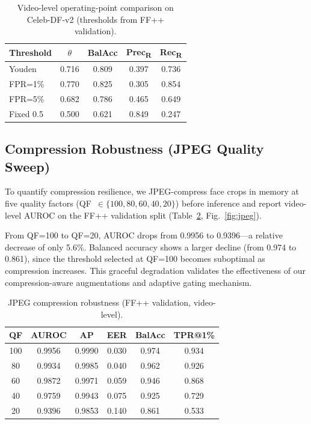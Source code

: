 \documentclass[conference]{IEEEtran}
\begin{document}
\begin{table}[t]
\centering
\caption{Video-level operating-point comparison on Celeb-DF-v2 (thresholds from FF++ validation).}
\label{tab:operating}
\begin{tabular}{lcccc}
\toprule
\textbf{Threshold} & \textbf{$\theta$} & \textbf{BalAcc} & \textbf{Prec\textsubscript{R}} & \textbf{Rec\textsubscript{R}} \\
\midrule
Youden  & 0.716 & 0.809 & 0.397 & 0.736 \\
FPR=1\% & 0.770 & 0.825 & 0.305 & 0.854 \\
FPR=5\% & 0.682 & 0.786 & 0.465 & 0.649 \\
Fixed 0.5 & 0.500 & 0.621 & 0.849 & 0.247 \\
\bottomrule
\end{tabular}
\end{table}

\subsection{Compression Robustness (JPEG Quality Sweep)}
To quantify compression resilience, we JPEG-compress face crops in memory at five quality factors (QF~$\in\{100,80,60,40,20\}$) before inference and report video-level AUROC on the FF++ validation split (Table~\ref{tab:jpeg}, Fig.~\ref{fig:jpeg}).

From QF=100 to QF=20, AUROC drops from 0.9956 to 0.9396---a relative decrease of only 5.6\%.
Balanced accuracy shows a larger decline (from 0.974 to 0.861), since the threshold selected at QF=100 becomes suboptimal as compression increases.
This graceful degradation validates the effectiveness of our compression-aware augmentations and adaptive gating mechanism.

\begin{table}[t]
\centering
\caption{JPEG compression robustness (FF++ validation, video-level).}
\label{tab:jpeg}
\begin{tabular}{cccccc}
\toprule
\textbf{QF} & \textbf{AUROC} & \textbf{AP} & \textbf{EER} & \textbf{BalAcc} & \textbf{TPR@1\%} \\
\midrule
100 & 0.9956 & 0.9990 & 0.030 & 0.974 & 0.934 \\
80  & 0.9934 & 0.9985 & 0.040 & 0.962 & 0.926 \\
60  & 0.9872 & 0.9971 & 0.059 & 0.946 & 0.868 \\
40  & 0.9759 & 0.9943 & 0.075 & 0.925 & 0.729 \\
20  & 0.9396 & 0.9853 & 0.140 & 0.861 & 0.533 \\
\bottomrule
\end{tabular}
\end{table}
\end{document}
